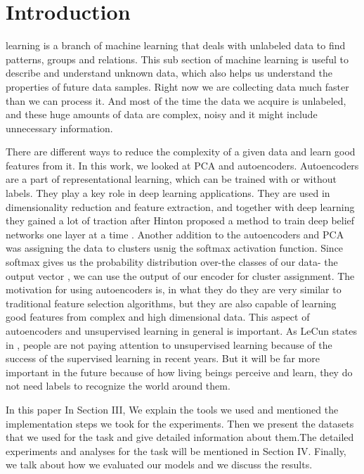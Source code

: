 \documentclass[journal]{IEEEtran}
\begin{document}
\section{Introduction}
% 
% 
% 
% 
 learning is a branch of machine learning that deals with unlabeled data to find patterns, groups
and relations. This sub section of machine learning is useful to describe and understand unknown data, which 
also helps us understand the properties of future data samples. Right now we are collecting data much faster than we can process it.
And most of the time the data we acquire is unlabeled, and these huge amounts of data are complex, noisy
and it might include unnecessary information.\par There are different ways to reduce the complexity of a given data and learn good 
features from it. In this work, we looked at PCA and autoencoders. 
Autoencoders are a part of representational learning, which can be trained with or without labels.
They play a key role in deep learning applications. They are used in dimensionality reduction and feature 
extraction, and together with deep learning they gained a lot of traction after Hinton proposed a method to train 
deep belief networks one layer at a time \cite{hinton2006fast}. Another addition to the autoencoders and PCA was assigning the data to clusters usnig the softmax activation function.
Since softmax gives us the probability distribution over-the classes of our data- the output vector \cite[pp. 178-181]{goodfellow2016deep}, we can use the output of our
encoder for cluster assignment. The motivation for using autoencoders is, in what they do they are
very similar to traditional feature selection algorithms, but they are also capable of learning good features from
complex and high dimensional data. This aspect of autoencoders and unsupervised learning in general is important. 
As LeCun states in \cite{lecun2015deep}, people are not paying attention to unsupervised learning because of the success of the supervised learning
in recent years. But it will be far more important in the future because of how living beings perceive and learn, they do not
need labels to recognize the world around them.\par In this paper  In Section III, We explain the tools we used and mentioned the implementation steps we took for the experiments. Then we present the datasets that we used for the task and give detailed information about them.The detailed experiments and analyses for the task will be mentioned in Section IV.
Finally, we talk about how we evaluated our models and we discuss the results.
\end{document}
